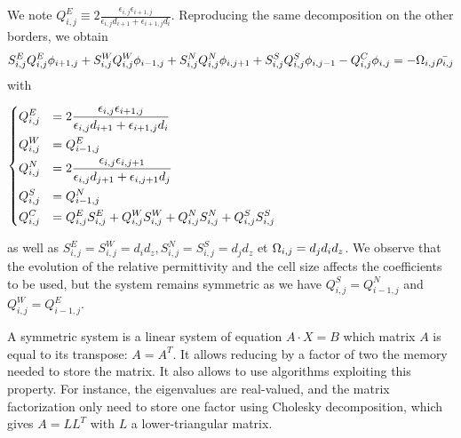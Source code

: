     We note $Q^E_{i,j} \equiv 2\frac{\epsilon_{i,j} \epsilon_{i+1,j}}{\epsilon_{i,j} d_{i+1} + \epsilon_{i+1,j} d_i}$.
    Reproducing the same decomposition on the other borders, we obtain
    \begin{equation}
      \label{eq-descretPoisson1}
    S^E_{i,j} Q^E_{i,j} \phi_{i+1,j} + S^W_{i,j} Q^W_{i,j} \phi_{i-1,j} + S^N_{i,j} Q^N_{i,j} \phi_{i,j+1} + S^S_{i,j} Q^S_{i,j} \phi_{i,j-1} - Q^C_{i,j} \phi_{i,j} = - \Omega_{i,j} \bar{\rho_{i,j}}
    \end{equation}
    with
    \begin{center}
      $\begin{dcases}
     Q^E_{i,j} &= 2\frac{\epsilon_{i,j} \epsilon_{i+1,j}}{\epsilon_{i,j} d_{i+1} + \epsilon_{i+1,j} d_i} \\
     Q^W_{i,j} &= Q^E_{i-1,j} \\
     Q^N_{i,j} &= 2\frac{\epsilon_{i,j} \epsilon_{i,j+1}}{\epsilon_{i,j} d_{j+1} + \epsilon_{i,j+1} d_{j}}\\
     Q^S_{i,j} &= Q^N_{i-1,j} \\
     Q^C_{i,j} &= Q^E_{i,j}S^E_{i,j}+Q^W_{i,j}S^W_{i,j}+Q^N_{i,j}S^N_{i,j}+Q^S_{i,j}S^S_{i,j}
     \end{dcases}$
    \end{center}

    as well as $S^E_{i,j} = S^W_{i,j} =d_id_z, S^N_{i,j} = S^S_{i,j}= d_jd_z$ et $\Omega_{i,j} = d_jd_id_z$.
    We observe that the evolution of the relative permittivity and the cell size affects the coefficients to be used, but the system remains symmetric as we have $Q^S_{i,j} = Q^N_{i-1,j}$ and $ Q^W_{i,j} = Q^E_{i-1,j}$.
    
    A symmetric system is a linear system of equation $A \cdot X = B$  which matrix $A$ is equal to its transpose\string: $A = A^T$.
    It allows reducing by a factor of two the memory needed to store the matrix.
    It also allows to use algorithms exploiting this property.
    For instance, the eigenvalues are real-valued, and the matrix factorization only need to store one factor using Cholesky decomposition, which gives $A = L L^T$ with $L$ a lower-triangular matrix. 

